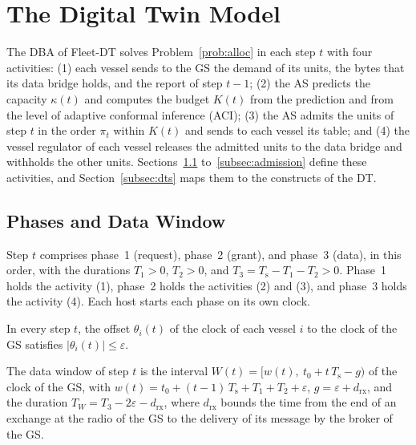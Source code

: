 \section{The Digital Twin Model}\label{sec:dt}

The DBA of Fleet-DT solves Problem~\ref{prob:alloc} in each step $t$ with four activities: (1) each vessel sends to the GS the demand of its units, the bytes that its data bridge holds, and the report of step $t-1$; (2) the AS predicts the capacity $\kappa(t)$ and computes the budget $K(t)$ from the prediction and from the level of adaptive conformal inference (ACI); (3) the AS admits the units of step $t$ in the order $\pi_t$ within $K(t)$ and sends to each vessel its table; and (4) the vessel regulator of each vessel releases the admitted units to the data bridge and withholds the other units. Sections~\ref{subsec:window} to~\ref{subsec:admission} define these activities, and Section~\ref{subsec:dts} maps them to the constructs of the DT.

\subsection{Phases and Data Window}\label{subsec:window}

\begin{definition}\label{def:phases}
Step $t$ comprises phase~1 (request), phase~2 (grant), and phase~3 (data), in this order, with the durations $T_1 > 0$, $T_2 > 0$, and $T_3 = T_{\mathrm{s}} - T_1 - T_2 > 0$. Phase~1 holds the activity (1), phase~2 holds the activities (2) and (3), and phase~3 holds the activity (4). Each host starts each phase on its own clock.
\end{definition}

\begin{assumption}\label{as:clock}
In every step $t$, the offset $\theta_i(t)$ of the clock of each vessel $i$ to the clock of the GS satisfies $|\theta_i(t)| \leq \varepsilon$.
\end{assumption}

\begin{definition}\label{def:window}
The data window of step $t$ is the interval $W(t) = [w(t),\ t_0 + t\,T_{\mathrm{s}} - g)$ of the clock of the GS, with $w(t) = t_0 + (t-1)\,T_{\mathrm{s}} + T_1 + T_2 + \varepsilon$, $g = \varepsilon + d_{\mathrm{rx}}$, and the duration $T_W = T_3 - 2\varepsilon - d_{\mathrm{rx}}$, where $d_{\mathrm{rx}}$ bounds the time from the end of an exchange at the radio of the GS to the delivery of its message by the broker of the GS.
\end{definition}

